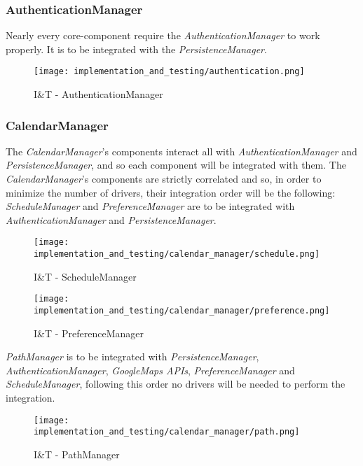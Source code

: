 \subsubsection{AuthenticationManager}
Nearly every core-component require the \textit{AuthenticationManager} to work properly. It is to be integrated with the \textit{PersistenceManager}.
\begin{figure}[H]
	\begin{center}
		\texttt{[image: implementation\_and\_testing/authentication.png]}
	\end{center}
	\caption{I\&T - AuthenticationManager}
\end{figure}

\subsubsection{CalendarManager}
The \textit{CalendarManager}'s components interact all with \textit{AuthenticationManager} and \textit{PersistenceManager}, and so each component will be integrated with them.
The \textit{CalendarManager}'s components are strictly correlated and so, in order to minimize the number of drivers, their integration order will be the following:
\textit{ScheduleManager} and \textit{PreferenceManager} are to be integrated with \textit{AuthenticationManager} and \textit{PersistenceManager}.
\begin{figure}[H]
	\begin{center}
		\texttt{[image: implementation\_and\_testing/calendar\_manager/schedule.png]}
	\end{center}
	\caption{I\&T - ScheduleManager}
\end{figure}
\begin{figure}[H]
	\begin{center}
		\texttt{[image: implementation\_and\_testing/calendar\_manager/preference.png]}
	\end{center}
	\caption{I\&T - PreferenceManager}
\end{figure}
\noindent
\textit{PathManager} is to be integrated with \textit{PersistenceManager}, \textit{AuthenticationManager}, \textit{GoogleMaps APIs}, \textit{PreferenceManager} and \textit{ScheduleManager}, following this order no drivers will be needed to perform the integration.
\begin{figure}[H]
	\begin{center}
		\texttt{[image: implementation\_and\_testing/calendar\_manager/path.png]}
	\end{center}
	\caption{I\&T - PathManager}
\end{figure}
